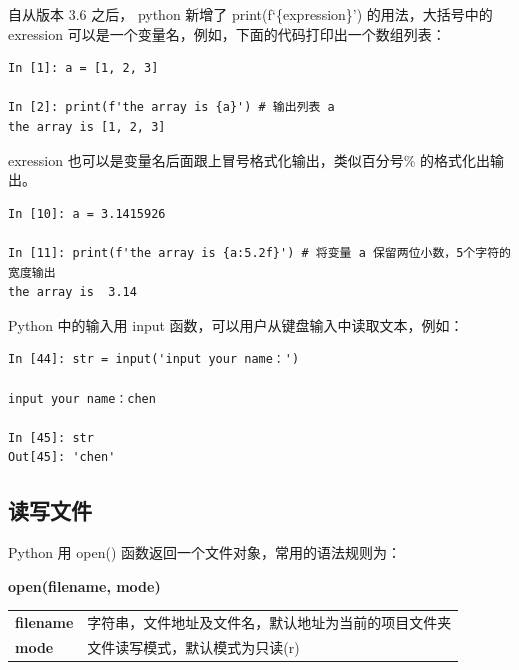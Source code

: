自从版本 3.6 之后， python 新增了 print(f`\{expression\}') 的用法，大括号中的 exression 可以是一个变量名，例如，下面的代码打印出一个数组列表：


\begin{lstlisting}[Language=Python]
In [1]: a = [1, 2, 3]

In [2]: print(f'the array is {a}') # 输出列表 a
the array is [1, 2, 3]
\end{lstlisting}

exression 也可以是变量名后面跟上冒号格式化输出，类似百分号\% 的格式化出输出。

\begin{lstlisting}[Language=Python]
In [10]: a = 3.1415926

In [11]: print(f'the array is {a:5.2f}') # 将变量 a 保留两位小数，5个字符的宽度输出
the array is  3.14
\end{lstlisting}



Python 中的输入用 input 函数，可以用户从键盘输入中读取文本，例如：

\begin{lstlisting}[Language=Python]
In [44]: str = input('input your name：')

input your name：chen

In [45]: str
Out[45]: 'chen'
\end{lstlisting}

\subsection{读写文件}

Python 用 open() 函数返回一个文件对象，常用的语法规则为：

\begin{center}
\begin{tcolorbox}[title = open 函数的语法]
\textbf{open(filename, mode)}
\tcblower
\vspace{10pt}
\begin{tcboutputlisting}
\begin{tabular}{>{\bfseries}ll}
  filename &字符串，文件地址及文件名，默认地址为当前的项目文件夹\\
  mode & 文件读写模式，默认模式为只读(r)
\end{tabular}
\end{tcboutputlisting}
\tcbuselistingtext

\end{tcolorbox}
\end{center}

